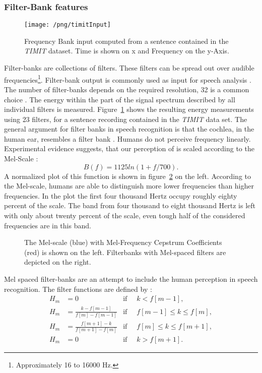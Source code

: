 \subsubsection{Filter-Bank features}
\begin{figure}
\centering
\texttt{[image: /png/timitInput]}
\caption{Frequency Bank input computed from a sentence contained in the \textit{TIMIT} dataset. Time is shown on x and Frequency on the y-Axis.}
\label{fig:timitInput}
\end{figure}
Filter-banks are collections of filters. These filters can be spread out over audible frequencies\footnote{Approximately 16 to 16000 Hz.}. Filter-bank output is commonly used as input for speech analysis \cite{Huang2001}\cite{Chan2015}. The number of filter-banks depends on the required resolution, 32 is a common choice \cite{Juang1987}. The energy within the part of the signal spectrum described by all individual filters is measured. Figure~\ref{fig:timitInput} shows the resulting energy measurements using 23 filters, for a sentence recording contained in the \textit{TIMIT} data set.
The general argument for filter banks in speech recognition is that the cochlea, in the human ear, resembles a filter bank \cite[page 30]{Huang2001}. Humans do not perceive frequency linearly. Experimental evidence suggests, that our perception of is scaled according to the Mel-Scale \cite[page 34]{Huang2001}:
\begin{equation}
B(f) = 1125 ln(1 + f / 700).
\end{equation}
A normalized plot of this function is shown in figure~\ref{fig:mel} on the left.
According to the Mel-scale, humans are able to distinguish more lower frequencies than higher frequencies. In the plot the first four thousand Hertz occupy roughly eighty percent of the scale. The band from four thousand to eight thousand Hertz is left with only about twenty percent of the scale, even tough half of the considered frequencies are in this band.
\begin{figure}
\centering


\caption{The Mel-scale (blue) with Mel-Frequency Cepstrum Coefficients (red)  is shown on the left. Filterbanks with Mel-spaced filters are depicted on the right.}
\label{fig:mel}
\end{figure}
Mel spaced filter-banks are an attempt to include the human perception in speech recognition. The filter functions are defined by \cite[page 317]{Huang2001}:
\begin{align}
H_m &= 0 									   &\text{if}\;\; & k < f[m-1], \\
H_m &= \frac{k      - f[m-1] }{f[m] - f[m-1]}  &\text{if}\;\; & f[m-1] \leq k \leq f[m], \\
H_m &= \frac{f[m+1] - k      }{f[m + 1] - f[m]}&\text{if}\;\; & f[m] \leq k \leq f[m+1], \\
H_m &= 0									   &\text{if}\;\; & k > f[m+1].
\end{align}
